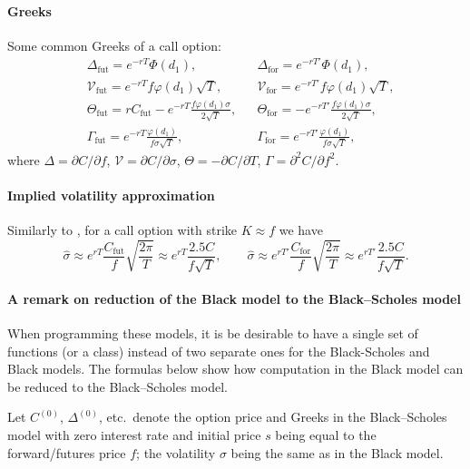 \documentclass[a4paper,11pt,titlepage]{article}
\renewcommand{\phi}{\varphi}
\newcommand{\Vega}{\mathcal{V}}
\renewcommand{\hat}{\widehat}
\theoremstyle{remark}
\begin{document}
\paragraph{Greeks}
Some common Greeks of a call option:
\begin{align*}
&\Delta_\mathrm{fut}  = e^{-rT}\Phi(d_1),&
&\Delta_\mathrm{for}  = e^{-rT'}\Phi(d_1),\\
&\Vega_\mathrm{fut}   = e^{-rT}f  \phi(d_1)\sqrt T,&
&\Vega_\mathrm{for}   = e^{-rT'}f  \phi(d_1)\sqrt T,\\
&\Theta_\mathrm{fut}  = r C_\mathrm{fut} - 
                          e^{-rT}\frac{f\phi(d_1)\sigma}{2\sqrt T},&
&\Theta_\mathrm{for}  = -e^{-rT'}\frac{f\phi(d_1)\sigma}{2\sqrt T},\\
&\Gamma_\mathrm{fut}  = e^{-rT}\frac{\phi(d_1)}{f\sigma\sqrt T},&
&\Gamma_\mathrm{for}  = e^{-rT'}\frac{\phi(d_1)}{f\sigma\sqrt T},
\end{align*}
where $\Delta = \partial C/\partial f$,
$\mathcal{V} = \partial C/\partial \sigma$,
$\Theta = -\partial C/\partial T$,
$\Gamma = \partial^2 C/ \partial f^2$.

\paragraph{Implied volatility approximation} 
Similarly to \cite{Brenner88}, for a call option with strike $K\approx f$ we have
\[
\hat\sigma 
  \approx  e^{rT}\frac{C_\mathrm{fut}}{f} \sqrt{\frac{2\pi}T} 
  \approx e^{rT} \frac{2.5C}{f\sqrt{T}}, \qquad
\hat\sigma 
  \approx e^{rT'}\frac{C_\mathrm{for}}{f} \sqrt{\frac{2\pi}T}
  \approx e^{rT'} \frac{2.5C}{f\sqrt{T}}.
\]

\paragraph{A remark on reduction of the Black model to the Black--Scholes model}
When programming these models, it is be desirable to have a single set of functions (or a class)  instead of two separate ones for the Black-Scholes and Black models.
The formulas below show how computation in the Black model can be reduced to the Black--Scholes model.

Let $C^{(0)}$, $\Delta^{(0)}$, etc.\ denote the option price and Greeks in the Black--Scholes model with zero interest rate and initial price $s$ being equal to the forward/futures price $f$; the volatility $\sigma$ being the same as in the Black model.
\end{document}
